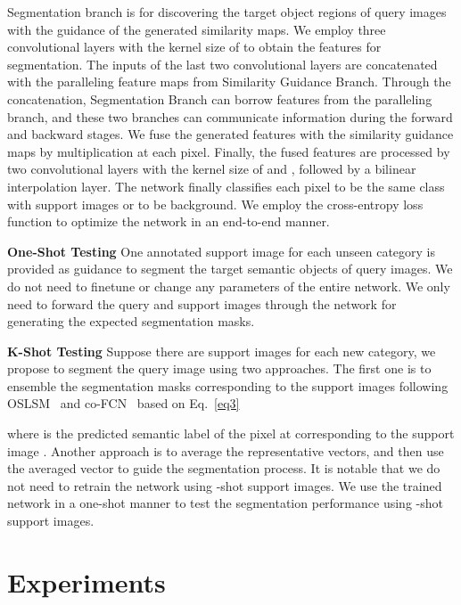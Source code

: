\documentclass[journal]{IEEEtran}
\begin{document}
Segmentation branch is for discovering the target object regions of query images with the guidance of the generated similarity maps.
We employ three convolutional layers with the kernel size of  to obtain the features for segmentation.
The inputs of the last two convolutional layers are concatenated with the paralleling feature maps from Similarity Guidance Branch.
Through the concatenation, Segmentation Branch can borrow features from the paralleling branch, and these two branches can communicate information during the forward and backward stages.
We fuse the generated features with the similarity guidance maps by multiplication at each pixel. 
Finally, the fused features are processed by two convolutional layers with the kernel size of  and , followed by a bilinear interpolation layer.
The network finally classifies each pixel to be the same class with support images or to be background.
We employ the cross-entropy loss function to optimize the network in an end-to-end manner.

\noindent \textbf{One-Shot Testing}
One annotated support image for each unseen category is provided as guidance to segment the target semantic objects of query images.
We do not need to finetune or change any parameters of the entire network.
We only need to forward the query and support images through the network for generating the expected segmentation masks.

\noindent \textbf{K-Shot Testing}
Suppose there are   support images  for each new category, we propose to segment the query image  using two approaches.
The first one is to ensemble the segmentation masks corresponding to the  support images following OSLSM~\cite{shaban2017one} and co-FCN~\cite{rakelly2018conditional} based on Eq.~\eqref{eq3}

where  is the predicted semantic label of the pixel at  corresponding to the support image .
Another approach is to average the  representative vectors, and then use the averaged vector to guide the segmentation process.
It is notable that we do not need to retrain the network using -shot support images.
We use the trained network in a one-shot manner to test the segmentation performance using -shot support images.




\section{Experiments}
\end{document}

